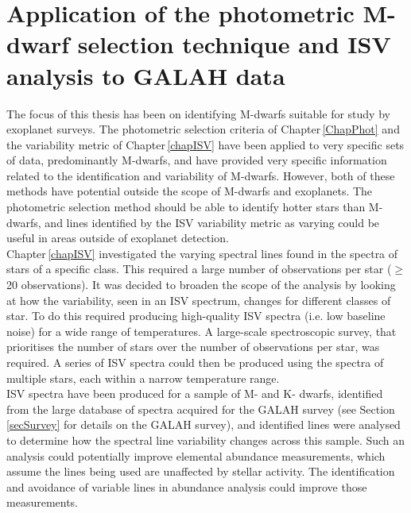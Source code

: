 \chapter{Application of the photometric M-dwarf selection technique and ISV analysis to GALAH data}
\label{chapGALAH}
The focus of this thesis has been on identifying M-dwarfs suitable for study by exoplanet surveys. The photometric selection criteria of Chapter\,\ref{ChapPhot} and the variability metric of Chapter\,\ref{chapISV} have been applied to very specific sets of data, predominantly M-dwarfs, and have provided very specific information related to the identification and variability of M-dwarfs. However, both of these methods have potential outside the scope of M-dwarfs and exoplanets. The photometric selection method should be able to identify hotter stars than M-dwarfs, and lines identified by the ISV variability metric as varying could be useful in areas outside of exoplanet detection.\\

Chapter\,\ref{chapISV} investigated the varying spectral lines found in the spectra of stars of a specific class. This required a large number of observations per star ($\geq$20 observations). It was decided to broaden the scope of the analysis by looking at how the variability, seen in an ISV spectrum, changes for different classes of star. To do this required producing high-quality ISV spectra (i.e. low baseline noise) for a wide range of temperatures. A large-scale spectroscopic survey, that prioritises the number of stars over the number of observations per star, was required. A series of ISV spectra could then be produced using the spectra of multiple stars, each within a narrow temperature range.\\ 

ISV spectra have been produced for a sample of M- and K- dwarfs, identified from the large database of spectra acquired for the GALAH survey (see Section\,\ref{secSurvey} for details on the GALAH survey), and identified lines were analysed to determine how the spectral line variability changes across this sample. Such an analysis could potentially improve elemental abundance measurements, which assume the lines being used are unaffected by stellar activity. The identification and avoidance of variable lines in abundance analysis could improve those measurements.\\

